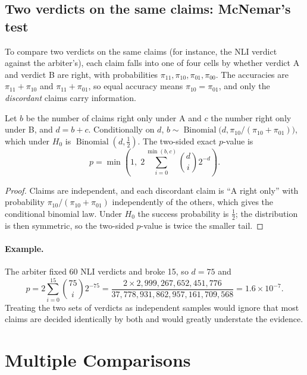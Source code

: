 \subsection{Two verdicts on the same claims: McNemar's test}

To compare two verdicts on the same claims (for instance, the NLI verdict against the arbiter's), each claim falls into one of four cells by whether verdict A and verdict B are right, with probabilities $\pi_{11}, \pi_{10}, \pi_{01}, \pi_{00}$. The accuracies are $\pi_{11} + \pi_{10}$ and $\pi_{11} + \pi_{01}$, so equal accuracy means $\pi_{10} = \pi_{01}$, and only the \emph{discordant} claims carry information.

\begin{proposition}
Let $b$ be the number of claims right only under A and $c$ the number right only under B, and $d = b + c$. Conditionally on $d$, $b \sim \operatorname{Binomial}\bigl(d, \pi_{10}/(\pi_{10} + \pi_{01})\bigr)$, which under $H_0$ is $\operatorname{Binomial}(d, \tfrac12)$. The two-sided exact $p$-value is
\begin{equation}
\label{eq:mcnemar}
  p = \min\left(1,\; 2 \sum_{i=0}^{\min(b,c)} \binom{d}{i} 2^{-d}\right).
\end{equation}
\end{proposition}

\begin{proof}
Claims are independent, and each discordant claim is ``A right only'' with probability $\pi_{10}/(\pi_{10} + \pi_{01})$ independently of the others, which gives the conditional binomial law. Under $H_0$ the success probability is $\tfrac12$; the distribution is then symmetric, so the two-sided $p$-value is twice the smaller tail.
\end{proof}

\paragraph{Example.} The arbiter fixed 60 NLI verdicts and broke 15, so $d = 75$ and
\[
  p = 2 \sum_{i=0}^{15} \binom{75}{i} 2^{-75} = \frac{2 \times 2{,}999{,}267{,}652{,}451{,}776}{37{,}778{,}931{,}862{,}957{,}161{,}709{,}568} = 1.6 \times 10^{-7}.
\]
Treating the two sets of verdicts as independent samples would ignore that most claims are decided identically by both and would greatly understate the evidence.

\section{Multiple Comparisons}
\label{sec:multiple}

